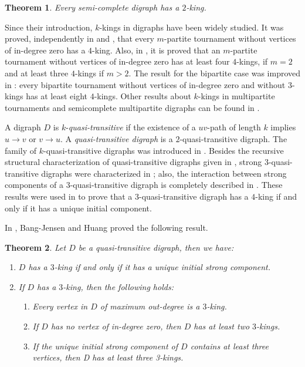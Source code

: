 \documentclass[preprint]{elsarticle}
\newtheorem{thm}{Theorem}[section]
\begin{document}
\begin{thm} \label{sc-2k}
Every semi-complete digraph has a $2$-king.
\end{thm}

Since their introduction, $k$-kings in digraphs have been widely studied.   It was proved, independently in \cite{G} and \cite{P-T},  that every $m$-partite tournament without vertices of in-degree zero has a $4$-king.   Also, in \cite{K-T1}, it is proved that an $m$-partite tournament without vertices of in-degree zero has at least four $4$-kings, if $m = 2$ and at least three $4$-kings if $m > 2$.   The result for the bipartite case was improved in \cite{K-T2}: every bipartite tournament without vertices of in-degree zero and without $3$-kings has at least eight $4$-kings.   Other results about $k$-kings in multipartite tournaments and semicomplete multipartite digraphs can be found in \cite{G-Y,PTr,T}.

A digraph $D$ is $k$-\emph{quasi-transitive} if the existence of a $uv$-path of length $k$ implies $u \to v$ or $v \to u$.   A \emph{quasi-transitive digraph} is a $2$-quasi-transitive digraph.   The family of $k$-quasi-transitive digraphs was introduced in \cite{GS-HC}.   Besides the recursive structural characterization of quasi-transitive digraphs given in \cite{BJQT}, strong $3$-quasi-transitive digraphs were characterized in \cite{GS-G-U}; also, the interaction between strong components of a $3$-quasi-transitive digraph is completely described in \cite{WW2}.   These results were used in \cite{GS-HC} to prove that a $3$-quasi-transitive digraph has a $4$-king if and only if it has a unique initial component.

In \cite{BJ-H2}, Bang-Jensen and Huang proved the following result.

\begin{thm} \label{BJHT}
	Let $D$ be a quasi-transitive digraph, then we have:
	\begin{enumerate}
		\item $D$ has a $3$-king if and only if it has a unique initial strong component.
		\item If $D$ has a $3$-king, then the following holds:
			  \begin{enumerate}
				\item Every vertex in $D$ of maximum out-degree is a $3$-king.
				\item If $D$ has no vertex of in-degree zero, then $D$ has at least two $3$-kings.
				\item If the unique initial strong component of $D$ contains at least three vertices, then D has at least three 3-kings.
			  \end{enumerate}
	\end{enumerate}
\end{thm}
\end{document}
